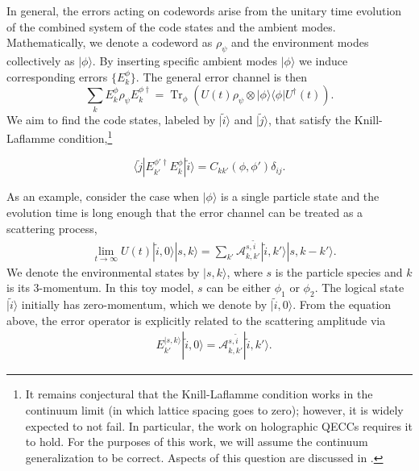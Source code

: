 \documentclass[11pt,english]{article}
\DeclareMathOperator{\Tr}{Tr}
\begin{document}
 In general, the errors acting on codewords arise from the unitary time evolution of the combined system of the code states and the ambient modes. Mathematically, we denote a codeword as $\rho_{\psi}$ and the environment modes collectively as $|\phi\rangle$. By inserting specific ambient modes $|\phi\rangle$ we induce corresponding errors $\{E^{\phi}_k\}$.  The general error channel is then
\begin{equation}
    \sum_k E^{\phi}_k\rho_{\psi}E^{\phi \dagger}_k=\Tr_{\phi}( U(t)\rho_{\psi}\otimes|\phi\rangle\langle\phi|U^{\dagger}(t) ).
\end{equation}
 We aim to find the code states, labeled by $|\tilde i\rangle$ and $|\tilde j\rangle$, that satisfy the  Knill-Laflamme condition,\footnote{It remains conjectural that the Knill-Laflamme condition works in the continuum limit (in which lattice spacing goes to zero); however, it is widely expected to not fail. In particular, the work on holographic QECCs \cite{Almheiri_2015} requires it to hold. For the purposes of this work, we will assume the continuum generalization to be correct. Aspects of this question are discussed in \cite{Faist_2020}.} 
 
 \begin{equation}\label{eqKLQCD}
 \langle\tilde{j}|E^{\phi'\dagger}_{k'}E^{\phi}_k|\tilde{i}\rangle=C_{kk'}(\phi,\phi')\delta_{ij}.
 \end{equation}
 
 
 
 
 As an example, consider the case when  $|\phi\rangle$ is a single particle state and the evolution time is long enough that the error channel can be treated as a scattering process,
 \begin{equation}
 \begin{split}
     &\lim_{t\rightarrow\infty}U(t)|\tilde{i},0\rangle|s,k\rangle=\sum_{k'}\mathcal{A}^{s,\tilde{i}}_{k, k'}|\tilde{i},k'\rangle|s,k-k'\rangle.
\end{split}
 \end{equation}
 We denote the environmental states by $|s,k\rangle$, where $s$ is the particle species and $k$ is its 3-momentum. In this toy model, $s$ can be either $\phi_1$ or $\phi_2$.   The logical state $|\tilde{i}\rangle$ initially has zero-momentum, which we denote by $|\tilde{i},0\rangle$. From the equation above, the error operator is explicitly related to the scattering amplitude via 
 \begin{equation}
 \begin{split}
 &E^{|s,k\rangle}_{k'}|\tilde{i},0\rangle=\mathcal{A}^{s,\tilde{i}}_{k, k'}|\tilde{i},k'\rangle.
 \end{split}
 \end{equation}
 
\end{document}
